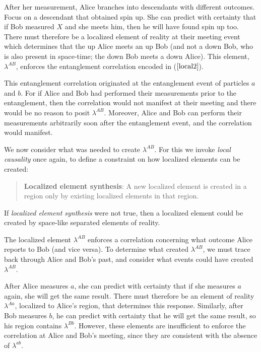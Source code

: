 \documentclass[12pt]{article}
\begin{document}
After her measurement, Alice branches into descendants with different outcomes. Focus on a descendant that obtained spin up. She can predict with certainty that if Bob measured $X$ and she meets him, then he will have found spin up too. There must therefore be a localized element of reality at their meeting event which determines that the up Alice meets an up Bob (and not a down Bob, who is also present in space-time; the down Bob meets a down Alice). This element, $\lambda^{AB}$, enforces the entanglement correlation encoded in ($\ref{local2}$). 

This entanglement correlation originated at the entanglement event of particles $a$ and $b$. For if Alice and Bob had performed their measurements prior to the entanglement, then the correlation would not manifest at their meeting and there would be no reason to posit $\lambda^{AB}$. Moreover, Alice and Bob can perform their measurements arbitrarily soon after the entanglement event, and the correlation would manifest. 

We now consider what was needed to create $\lambda^{AB}$. For this we invoke \textit{local causality} once again, to define a constraint on how localized elements can be created:

\begin{quote} 
\textbf{Localized element synthesis}: A new localized element is created in a region only by existing localized elements in that region.
\end{quote}

If \textit{localized element synthesis} were not true, then a localized element could be created by space-like separated elements of reality. 

The localized element $\lambda^{AB}$ enforces a correlation concerning what outcome Alice reports to Bob (and vice versa). To determine what created $\lambda^{AB}$, we must trace back through Alice and Bob's past, and consider what events could have created $\lambda^{AB}$. 

After Alice measures $a$, she can predict with certainty that if she measures $a$ again, she will get the same result. There must therefore be an element of reality $\lambda^{Aa}$, localized to Alice's region, that determines this response. Similarly, after Bob measures $b$, he can predict with certainty that he will get the same result, so his region contains $\lambda^{Bb}$. However, these elements are insufficient to enforce the correlation at Alice and Bob's meeting, since they are consistent with the absence of $\lambda^{ab}$.
\end{document}
